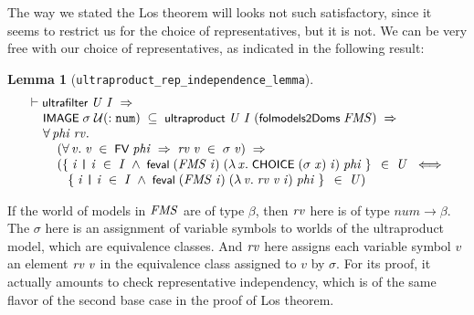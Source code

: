 \documentclass[letterpaper]{article}
\newtheorem{lm}{Lemma}
\renewcommand{\HOLConst}[1]{{\textsf{\upshape\small #1}}}
\renewcommand{\HOLinline}[1]{\ensuremath{#1}}
\newenvironment{holmath}{\begin{displaymath}\begin{array}{l}}{\end{array}\end{displaymath}\ignorespacesafterend}
\begin{document}
The way we stated the Los theorem will looks not such satisfactory, since it seems to restrict us for the choice of representatives, but it is not. We can be very free with our choice of representatives, as indicated in the following result:
\begin{lm}[\texttt{ultraproduct_rep_independence_lemma}]
\begin{holmath}
  \ensuremath{\HOLTokenTurnstile}\HOLConst{ultrafilter}\;\HOLFreeVar{U}\;\HOLFreeVar{I}\;\HOLSymConst{\HOLTokenImp{}}\\
\;\;\;\;\;\HOLConst{IMAGE}\;\HOLFreeVar{\ensuremath{\sigma}}\;\ensuremath{\cal{U}}(:\HOLTyOp{num})\;\HOLSymConst{\HOLTokenSubset{}}\;\HOLConst{ultraproduct}\;\HOLFreeVar{U}\;\HOLFreeVar{I}\;(\HOLConst{folmodels2Doms}\;\HOLFreeVar{FMS})\;\HOLSymConst{\HOLTokenImp{}}\\
\;\;\;\;\;\HOLSymConst{\HOLTokenForall{}}\HOLBoundVar{phi}\;\HOLBoundVar{rv}.\\
\;\;\;\;\;\;\;\;\;(\HOLSymConst{\HOLTokenForall{}}\HOLBoundVar{v}.\;\HOLBoundVar{v}\;\HOLSymConst{\HOLTokenIn{}}\;\HOLConst{FV}\;\HOLBoundVar{phi}\;\HOLSymConst{\HOLTokenImp{}}\;\HOLBoundVar{rv}\;\HOLBoundVar{v}\;\HOLSymConst{\HOLTokenIn{}}\;\HOLFreeVar{\ensuremath{\sigma}}\;\HOLBoundVar{v})\;\HOLSymConst{\HOLTokenImp{}}\\
\;\;\;\;\;\;\;\;\;(\HOLTokenLeftbrace{}\HOLBoundVar{i}\;\HOLTokenBar{}\;\HOLBoundVar{i}\;\HOLSymConst{\HOLTokenIn{}}\;\HOLFreeVar{I}\;\HOLSymConst{\HOLTokenConj{}}\;\HOLConst{feval}\;(\HOLFreeVar{FMS}\;\HOLBoundVar{i})\;(\HOLTokenLambda{}\HOLBoundVar{x}.\;\HOLConst{CHOICE}\;(\HOLFreeVar{\ensuremath{\sigma}}\;\HOLBoundVar{x})\;\HOLBoundVar{i})\;\HOLBoundVar{phi}\HOLTokenRightbrace{}\;\HOLSymConst{\HOLTokenIn{}}\;\HOLFreeVar{U}\;\HOLSymConst{\HOLTokenEquiv{}}\\
\;\;\;\;\;\;\;\;\;\;\;\;\HOLTokenLeftbrace{}\HOLBoundVar{i}\;\HOLTokenBar{}\;\HOLBoundVar{i}\;\HOLSymConst{\HOLTokenIn{}}\;\HOLFreeVar{I}\;\HOLSymConst{\HOLTokenConj{}}\;\HOLConst{feval}\;(\HOLFreeVar{FMS}\;\HOLBoundVar{i})\;(\HOLTokenLambda{}\HOLBoundVar{v}.\;\HOLBoundVar{rv}\;\HOLBoundVar{v}\;\HOLBoundVar{i})\;\HOLBoundVar{phi}\HOLTokenRightbrace{}\;\HOLSymConst{\HOLTokenIn{}}\;\HOLFreeVar{U})
\end{holmath}
\end{lm}
If the world of models in \HOLinline{\HOLFreeVar{FMS}} are of type $\beta$, then \HOLinline{\HOLFreeVar{rv}} here is of type $num\to\beta$. The $\sigma$ here is an assignment of variable symbols to worlds of the ultraproduct model, which are equivalence classes. And \HOLinline{\HOLFreeVar{rv}} here assigns each variable symbol $v$ an element \HOLinline{\HOLFreeVar{rv}\;\HOLFreeVar{v}} in the equivalence class assigned to $v$ by $\sigma$.%
For its proof, it actually amounts to check representative independency, which is of the same flavor of the second base case in the proof of Los theorem.
\end{document}

